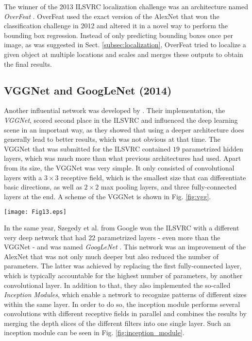 \documentclass[conference]{IEEEtran}
\begin{document}
The winner of the 2013 ILSVRC localization challenge was an architecture named \emph{OverFeat} \cite{Overfeat}. OverFeat used the exact version of the AlexNet that won the classification challenge in 2012 and altered it in a novel way to perform the bounding box regression. Instead of only predicting bounding boxes once per image, as was suggested in Sect. \ref{subsec:localization}, OverFeat tried to localize a given object at multiple locations and scales and merges these outputs to obtain the final results.


\subsection{VGGNet and GoogLeNet (2014)}\label{subsec:2014}
Another influential network was developed by \cite{VGG}. Their implementation, the \emph{VGGNet}, scored second place in the ILSVRC and influenced the deep learning scene in an important way, as they showed that using a deeper architecture does generally lead to better results, which was not obvious at that time. The VGGNet that was submitted for the ILSVRC contained $19$ parametrized hidden layers, which was much more than what previous architectures had used. Apart from its size, the VGGNet was very simple. It only consisted of convolutional layers with a  $3\times3$ receptive field, which is the smallest size that can differentiate basic directions, as well as $2\times2$ max pooling layers, and three fully-connected layers at the end. A scheme of the VGGNet is shown in Fig. \ref{fig:vgg}.

\begin{figure*}
\texttt{[image: Fig13.eps]}
\caption{The VGGNet, containing a total of 24 hidden layers, consisting of 16 $3\times3$ convolutional layers, five $2\times2$ max pooling layers, as well as three fully-connected layers}
\label{fig:vgg}
\end{figure*}

In the same year, Szegedy et al. from Google won the ILSVRC with a different very deep network that had $22$ parametrized layers - even more than the VGGNet - and was named \emph{GoogLeNet} \cite{GoogLeNet}. This network was an improvement of the AlexNet that was not only much deeper but also reduced the number of parameters. The latter was achieved by replacing the first fully-connected layer, which is typically accountable for the highest number of parameters, by another convolutional layer. In addition to that, they also implemented the so-called \emph{Inception Modules}, which enable a network to recognize patterns of different sizes within the same layer. In order to do so, the inception module performs several convolutions with different receptive fields in parallel and combines the results by merging the depth slices of the different filters into one single layer. Such an inception module can be seen in Fig. \ref{fig:inception_module}.
\end{document}
